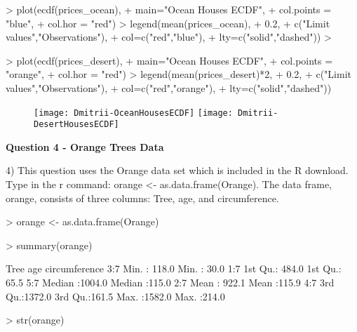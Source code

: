 \documentclass[12pt]{article}
\begin{document}
\begin{Schunk}
\begin{Sinput}
> plot(ecdf(prices_ocean), 
+      main="Ocean Houses ECDF", 
+      col.points = "blue",
+      col.hor = "red")
> legend(mean(prices_ocean), 
+        0.2,
+        c("Limit values","Observations"),
+        col=c("red","blue"),
+        lty=c("solid","dashed"))
> 
\end{Sinput}
\end{Schunk}
\begin{Schunk}
\begin{Sinput}
> plot(ecdf(prices_desert), 
+      main="Ocean Houses ECDF", 
+      col.points = "orange",
+      col.hor = "red")
> legend(mean(prices_desert)*2, 
+        0.2,
+        c("Limit values","Observations"),
+        col=c("red","orange"),
+        lty=c("solid","dashed"))
\end{Sinput}
\end{Schunk}
\begin{figure}
\texttt{[image: Dmitrii-OceanHousesECDF]}
\texttt{[image: Dmitrii-DesertHousesECDF]}
\end{figure}

\newpage
\begin{center}
{\bf\Large Question 4 - Orange Trees Data}
\linebreak
\end{center}

4) This question uses the Orange data set which is included in the R download. Type in
the r command: orange <- as.data.frame(Orange). The data frame, orange,
consists of three columns: Tree, age, and circumference.
\begin{Schunk}
\begin{Sinput}
> orange <- as.data.frame(Orange)
\end{Sinput}
\end{Schunk}
\begin{Schunk}
\begin{Sinput}
> summary(orange)
\end{Sinput}
\begin{Soutput}
 Tree       age         circumference  
 3:7   Min.   : 118.0   Min.   : 30.0  
 1:7   1st Qu.: 484.0   1st Qu.: 65.5  
 5:7   Median :1004.0   Median :115.0  
 2:7   Mean   : 922.1   Mean   :115.9  
 4:7   3rd Qu.:1372.0   3rd Qu.:161.5  
       Max.   :1582.0   Max.   :214.0  
\end{Soutput}
\begin{Sinput}
> str(orange)
\end{Sinput}
\end{Schunk}
\end{document}
